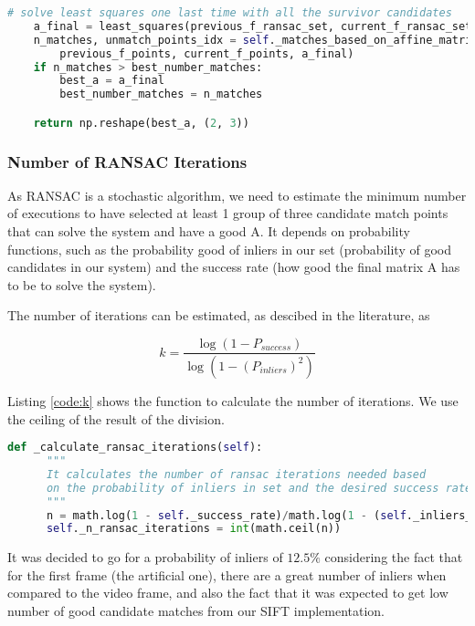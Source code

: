 \documentclass[]{IEEEtran}
\begin{document}
\begin{lstlisting}[language=Python, caption={RANSAC to estimate Affine Transformation Matrix}, label={code:ransac}]
    # solve least squares one last time with all the survivor candidates
    a_final = least_squares(previous_f_ransac_set, current_f_ransac_set)
    n_matches, unmatch_points_idx = self._matches_based_on_affine_matrix(
        previous_f_points, current_f_points, a_final)
    if n_matches > best_number_matches:
        best_a = a_final
        best_number_matches = n_matches

    return np.reshape(best_a, (2, 3))
\end{lstlisting}

\subsubsection{Number of RANSAC Iterations}
  As RANSAC is a stochastic algorithm, we need to estimate the minimum number of executions to have selected at least 1 group of three candidate match points that can solve the system and have a good A. It depends on probability functions, such as the probability good of inliers in our set (probability of good candidates in our system) and the success rate (how good the final matrix A has to be to solve the system). 

  The number of iterations can be estimated, as descibed in the literature, as

  \begin{equation}
    k = \dfrac{\log (1 - P_{success})}{\log (1 - (P_{inliers})^{2})}
  \end{equation}

  Listing \ref{code:k} shows the function to calculate the number of iterations. We use the ceiling of the result of the division.

  \begin{lstlisting}[language=Python, caption={Calculate number of RANSAC iterations}, label={code:k}]
    def _calculate_ransac_iterations(self):
      """
      It calculates the number of ransac iterations needed based
      on the probability of inliers in set and the desired success rate
      """
      n = math.log(1 - self._success_rate)/math.log(1 - (self._inliers_rate)**2)
      self._n_ransac_iterations = int(math.ceil(n))
  \end{lstlisting}

  It was decided to go for a probability of inliers of $12.5\%$ considering the fact that for the first frame (the artificial one), there are a great number of inliers when compared to the video frame, and also the fact that it was expected to get low number of good candidate matches from our SIFT implementation. 
\end{document}
